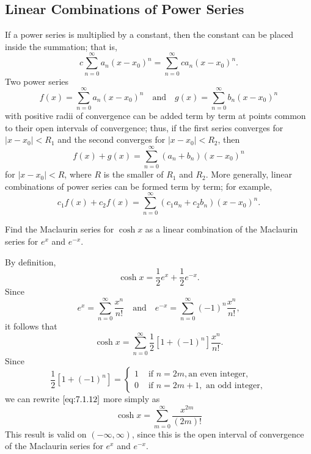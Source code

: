 \documentclass{ximera}
\begin{document}
\subsection*{Linear Combinations of Power Series}

If a power series is multiplied by a constant, then the constant can be
placed inside the summation; that is,
$$
c\sum_{n=0}^\infty a_n(x-x_0)^n=\sum_{n=0}^\infty ca_n(x-x_0)^n.
$$
Two power series
$$
f(x)=\sum_{n=0}^\infty a_n(x-x_0)^n\quad\mbox{and}\quad
g(x)=\sum_{n=0}^\infty b_n(x-x_0)^n
$$
with positive radii of convergence can be added term by term at points
common to their open intervals of convergence;   thus, if the first
series converges for $|x-x_0|<R_1$ and the second converges for
$|x-x_0|<R_2$, then
$$
f(x)+g(x)=\sum_{n=0}^\infty(a_n+b_n)(x-x_0)^n
$$
for $|x-x_0|<R$, where $R$ is the smaller of $R_1$ and $R_2$.
More generally, linear combinations of power series can be formed term
by term;   for example,
$$
c_1f(x)+c_2f(x)=\sum_{n=0}^\infty(c_1a_n+c_2b_n)(x-x_0)^n.
$$

\begin{example}\label{example:7.1.5}
Find the Maclaurin series for $\cosh x$  as a linear
combination of the Maclaurin series for $e^x$ and $e^{-x}$.

\begin{explanation}
By definition,
$$
\cosh x=\frac{1}{2}e^x+\frac{1}{2}e^{-x}.
$$
Since
$$ e^x=\sum_{n=0}^\infty  \frac{x^n}{n!}\quad\mbox{and}\quad
 e^{-x}=\sum_{n=0}^\infty (-1)^n \frac{x^n}{n!},
$$
it follows that
\begin{equation} \label{eq:7.1.12}
\cosh x=\sum_{n=0}^\infty \frac{1}{2}[1+(-1)^n]\frac{x^n}{n!}.
\end{equation}
Since
$$
\frac{1}{2}[1+(-1)^n]=\left\{\begin{array}{cl}1&\mbox{ if } n=2m,\mbox{
an even integer},\\ 0&\mbox{ if }n=2m+1,\mbox{ an odd integer},
\end{array}\right.
$$
we can rewrite $\eqref{eq:7.1.12}$ more simply as
$$
\cosh x=\sum_{m=0}^\infty\frac{x^{2m}}{(2m)!}
$$
This result is valid on $(-\infty,\infty)$, since this is the open
interval of convergence of the Maclaurin series for $e^x$ and
$e^{-x}$.
\end{explanation}
\end{example}
\end{document}
